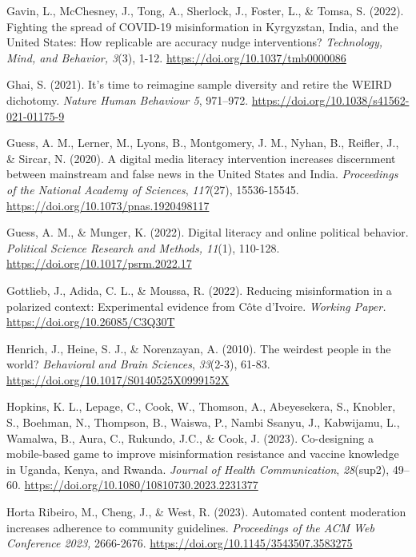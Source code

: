 \documentclass[authordate, reflection, issue]{jote-new-article}
\begin{document}
	Gavin, L., McChesney, J., Tong, A., Sherlock, J., Foster, L., \& Tomsa, S. (2022). Fighting the spread of COVID-19 misinformation in Kyrgyzstan, India, and the United States: How replicable are accuracy nudge interventions? \emph{Technology, Mind, and Behavior, 3}(3), 1-12. \url{https://doi.org/10.1037/tmb0000086}



	Ghai, S. (2021). It's time to reimagine sample diversity and retire the WEIRD dichotomy. \emph{Nature Human Behaviour 5}, 971--972. \url{https://doi.org/10.1038/s41562-021-01175-9}



	Guess, A. M., Lerner, M., Lyons, B., Montgomery, J. M., Nyhan, B., Reifler, J., \& Sircar, N. (2020). A digital media literacy intervention increases discernment between mainstream and false news in the United States and India. \emph{Proceedings of the National Academy of Sciences}, \emph{117}(27), 15536-15545. \url{https://doi.org/10.1073/pnas.1920498117}



	Guess, A. M., \& Munger, K. (2022). Digital literacy and online political behavior. \emph{Political Science Research and Methods, 11}(1), 110-128. \url{https://doi.org/10.1017/psrm.2022.17}



	Gottlieb, J., Adida, C. L., \& Moussa, R. (2022). Reducing misinformation in a polarized context: Experimental evidence from Côte d'Ivoire. \emph{Working Paper.} \url{https://doi.org/10.26085/C3Q30T}



	Henrich, J., Heine, S. J., \& Norenzayan, A. (2010). The weirdest people in the world? \emph{Behavioral and Brain Sciences}, \emph{33}(2-3), 61-83. \url{https://doi.org/10.1017/S0140525X0999152X}



	Hopkins, K. L., Lepage, C., Cook, W., Thomson, A., Abeyesekera, S., Knobler, S., Boehman, N., Thompson, B., Waiswa, P., Nambi Ssanyu, J., Kabwijamu, L., Wamalwa, B., Aura, C., Rukundo, J.C., \& Cook, J. (2023). Co-designing a mobile-based game to improve misinformation resistance and vaccine knowledge in Uganda, Kenya, and Rwanda. \emph{Journal of Health Communication}, \emph{28}(sup2), 49--60. \url{https://doi.org/10.1080/10810730.2023.2231377}



	Horta Ribeiro, M., Cheng, J., \& West, R. (2023). Automated content moderation increases adherence to community guidelines. \emph{Proceedings of the ACM Web Conference 2023,} 2666-2676. \url{https://doi.org/10.1145/3543507.3583275}
\end{document}
